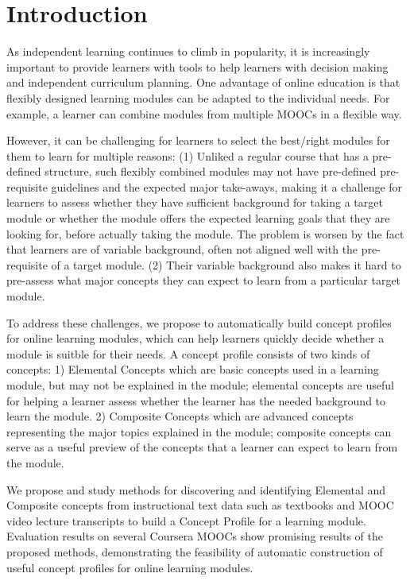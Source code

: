 \section{Introduction}
As independent learning continues to climb in popularity, it is increasingly important to provide learners with tools to help learners with decision making and independent curriculum planning. One advantage of online education is that flexibly designed learning modules can be adapted to the individual needs. For example, a learner can combine modules from multiple MOOCs in a flexible way. 

However, it can be challenging for learners to select the best/right modules for them to learn for multiple reasons: (1) Unliked a regular course that has a pre-defined structure, such flexibly combined modules may not have pre-defined pre-requisite guidelines and the expected major take-aways, making it a challenge for learners to assess whether they have sufficient background for taking a target module or whether the module offers the expected learning goals that they are looking for, before actually taking the module. The problem is worsen by the fact that learners are of variable background, often not aligned well with the pre-requisite of a target module. 
(2) Their variable background also makes it hard to pre-assess what major concepts they can expect to learn from a particular target module. 

To address these challenges, we propose to automatically build concept profiles for online learning modules, which can help learners quickly decide whether a module is suitble for their needs. A concept profile consists of two kinds of concepts: 1) Elemental Concepts which are basic concepts used in a learning module, but may not be explained in the module; elemental concepts are useful for helping a learner assess whether the learner has the needed background to learn the module. 2) Composite Concepts which are advanced concepts representing the major topics explained in the module; composite concepts can serve as a useful preview of the concepts that a learner can expect to learn from the module.

We propose and study methods for discovering and identifying Elemental and Composite concepts from instructional text data such as textbooks and MOOC video lecture transcripts to build a Concept Profile for a learning module. Evaluation results on several Coursera MOOCs show promising results of the proposed methods, demonstrating the feasibility of automatic construction of useful concept profiles for online learning modules.
